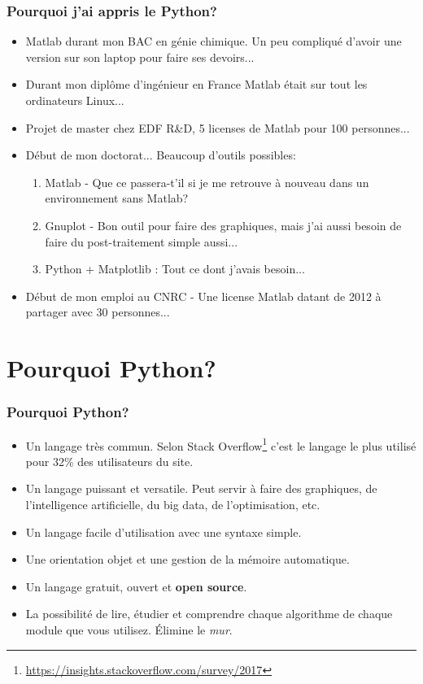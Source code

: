 \documentclass[]{beamer}
\begin{document}
\begin{frame}
\frametitle{Pourquoi j'ai appris le Python? }
\begin{itemize}
\item[2007]<1-> Matlab durant mon BAC en génie chimique. Un peu compliqué d'avoir une version sur son laptop pour faire ses devoirs...
\item[2010]<2-> Durant mon diplôme d'ingénieur en France Matlab était sur tout les ordinateurs Linux...
\item[2012]<3-> Projet de master chez EDF R\&D, 5 licenses de Matlab pour 100 personnes... 
\item[2012]<4-> Début de mon doctorat... Beaucoup d'outils possibles:
\begin{enumerate}
\item Matlab - Que ce passera-t'il si je me retrouve à nouveau dans un environnement sans Matlab?
\item Gnuplot - Bon outil pour faire des graphiques, mais  j'ai aussi besoin de faire du post-traitement simple aussi...
\item Python + Matplotlib : Tout ce dont j'avais besoin...
\end{enumerate}
\item[2016]<5-> Début de mon emploi au CNRC - Une license Matlab datant de 2012 à partager avec 30 personnes... 
\end{itemize}
\end{frame}

\section{Pourquoi Python?}
\begin{frame}
\frametitle{Pourquoi Python? }
\begin{itemize}
\item Un langage très commun. Selon Stack Overflow\footnote{\url{https://insights.stackoverflow.com/survey/2017}} c'est le langage le plus utilisé pour 32\% des utilisateurs du site.
\item Un langage puissant et versatile. Peut servir à faire des graphiques, de l'intelligence artificielle, du big data, de l'optimisation, etc. 
\item Un langage facile d'utilisation avec une syntaxe simple.
\item Une orientation objet et une gestion de la mémoire automatique.
\item Un langage gratuit, ouvert et \textbf{open source}.
\item La possibilité de lire, étudier et comprendre chaque algorithme de chaque module que vous utilisez. Élimine le \textit{mur}.
\end{itemize}
\end{frame}
\end{document}
